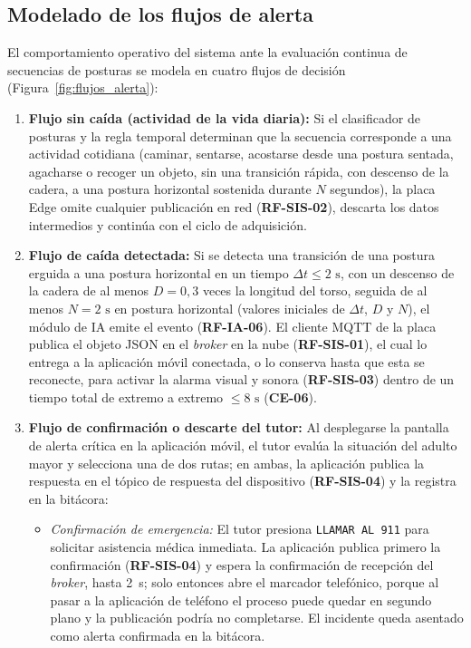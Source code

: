 \documentclass[12pt,a4paper,oneside]{book}
\theoremstyle{plain}
\theoremstyle{definition}
\theoremstyle{remark}
\begin{document}
\subsection{Modelado de los flujos de alerta}
El comportamiento operativo del sistema ante la evaluación continua de secuencias de posturas se modela en cuatro flujos de decisión (Figura~\ref{fig:flujos_alerta}):

\begin{enumerate}
    \item \textbf{Flujo sin caída (actividad de la vida diaria):} Si el clasificador de posturas y la regla temporal determinan que la secuencia corresponde a una actividad cotidiana (caminar, sentarse, acostarse desde una postura sentada, agacharse o recoger un objeto, sin una transición rápida, con descenso de la cadera, a una postura horizontal sostenida durante $N$ segundos), la placa Edge omite cualquier publicación en red (\textbf{RF-SIS-02}), descarta los datos intermedios y continúa con el ciclo de adquisición.
    \item \textbf{Flujo de caída detectada:} Si se detecta una transición de una postura erguida a una postura horizontal en un tiempo $\Delta t \leq 2\text{ s}$, con un descenso de la cadera de al menos $D = 0{,}3$ veces la longitud del torso, seguida de al menos $N = 2\text{ s}$ en postura horizontal (valores iniciales de $\Delta t$, $D$ y $N$), el módulo de IA emite el evento (\textbf{RF-IA-06}). El cliente MQTT de la placa publica el objeto JSON en el \textit{broker} en la nube (\textbf{RF-SIS-01}), el cual lo entrega a la aplicación móvil conectada, o lo conserva hasta que esta se reconecte, para activar la alarma visual y sonora (\textbf{RF-SIS-03}) dentro de un tiempo total de extremo a extremo $\leq 8\text{ s}$ (\textbf{CE-06}).
    \item \textbf{Flujo de confirmación o descarte del tutor:} Al desplegarse la pantalla de alerta crítica en la aplicación móvil, el tutor evalúa la situación del adulto mayor y selecciona una de dos rutas; en ambas, la aplicación publica la respuesta en el tópico de respuesta del dispositivo (\textbf{RF-SIS-04}) y la registra en la bitácora:
    \begin{itemize}
        \item \textit{Confirmación de emergencia:} El tutor presiona \texttt{LLAMAR AL 911} para solicitar asistencia médica inmediata. La aplicación publica primero la confirmación (\textbf{RF-SIS-04}) y espera la confirmación de recepción del \textit{broker}, hasta 2~s; solo entonces abre el marcador telefónico, porque al pasar a la aplicación de teléfono el proceso puede quedar en segundo plano y la publicación podría no completarse. El incidente queda asentado como alerta confirmada en la bitácora.

\end{itemize}
\end{enumerate}
\end{document}
